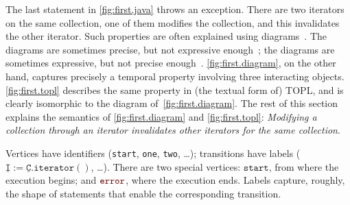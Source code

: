 \documentclass[preprint]{sigplanconf} %
\newcommand{\error}{\ensuremath{\textcolor{darkred}{\mathtt{error}}}\xspace}
\newcommand{\pattern}[1]{\ensuremath{\mathtt{\underline{#1}}}}
\newcommand{\start}{\ensuremath{\mathtt{start}}\xspace}
\theoremstyle{definition}
\theoremstyle{remark}
\begin{document}
The last statement in \autoref{fig:first.java} throws an exception.
There are two iterators on the same collection, one of them modifies the collection, and this invalidates the other iterator.
Such properties are often explained using diagrams~\cite{dblp:journals/scp/FieldGRY05,dblp:conf/issta/FinkYDRG06,dblp:conf/oopsla/bierhoffa07,dblp:conf/oopsla/naeeml08,dblp:conf/sigsoft/boddenlh08,dblp:conf/ecoop/bierhoffba09}.
The diagrams are sometimes precise, but not expressive enough~\cite{dblp:journals/scp/FieldGRY05,dblp:conf/issta/FinkYDRG06};
the diagrams are sometimes expressive, but not precise enough~\cite{dblp:conf/oopsla/bierhoffa07,dblp:conf/oopsla/naeeml08,dblp:conf/sigsoft/boddenlh08,dblp:conf/ecoop/bierhoffba09}.
\autoref{fig:first.diagram}, on the other hand, captures precisely a temporal property involving three interacting objects.
\autoref{fig:first.topl} describes the same property in (the textual form of) TOPL, and is clearly isomorphic to the diagram of~\autoref{fig:first.diagram}.
The rest of this section explains the semantics of \autoref{fig:first.diagram} and \autoref{fig:first.topl}:
\emph{Modifying a collection through an iterator invalidates other iterators for the same collection}.

Vertices have identifiers (\texttt{start}, \texttt{one}, \texttt{two}, \dots);
transitions have labels ($\pattern I:=\pattern C.\mathtt{iterator}()$, \dots).
There are two special vertices: \start, from where the execution begins; and \error, where the execution ends.
Labels capture, roughly, the shape of statements that enable the corresponding transition.
\end{document}
